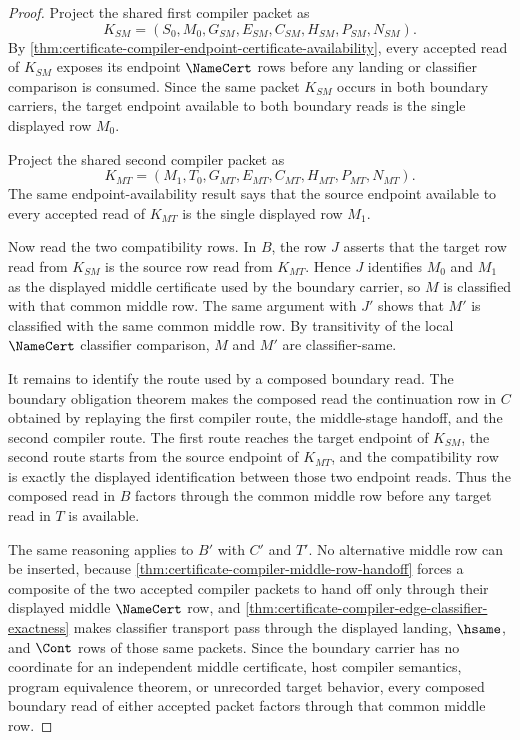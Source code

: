 \begin{proof}
Project the shared first compiler packet as
$$
K_{SM}=(S_{0},M_{0},G_{SM},E_{SM},C_{SM},H_{SM},P_{SM},N_{SM}).
$$
By \autoref{thm:certificate-compiler-endpoint-certificate-availability}, every accepted read of $K_{SM}$ exposes its endpoint $\NameCert$ rows before any landing or classifier comparison is consumed. Since the same packet $K_{SM}$ occurs in both boundary carriers, the target endpoint available to both boundary reads is the single displayed row $M_{0}$.

Project the shared second compiler packet as
$$
K_{MT}=(M_{1},T_{0},G_{MT},E_{MT},C_{MT},H_{MT},P_{MT},N_{MT}).
$$
The same endpoint-availability result says that the source endpoint available to every accepted read of $K_{MT}$ is the single displayed row $M_{1}$.

Now read the two compatibility rows. In $B$, the row $J$ asserts that the target row read from $K_{SM}$ is the source row read from $K_{MT}$. Hence $J$ identifies $M_{0}$ and $M_{1}$ as the displayed middle certificate used by the boundary carrier, so $M$ is classified with that common middle row. The same argument with $J'$ shows that $M'$ is classified with the same common middle row. By transitivity of the local $\NameCert$ classifier comparison, $M$ and $M'$ are classifier-same.

It remains to identify the route used by a composed boundary read. The boundary obligation theorem makes the composed read the continuation row in $C$ obtained by replaying the first compiler route, the middle-stage handoff, and the second compiler route. The first route reaches the target endpoint of $K_{SM}$, the second route starts from the source endpoint of $K_{MT}$, and the compatibility row is exactly the displayed identification between those two endpoint reads. Thus the composed read in $B$ factors through the common middle row before any target read in $T$ is available.

The same reasoning applies to $B'$ with $C'$ and $T'$. No alternative middle row can be inserted, because \autoref{thm:certificate-compiler-middle-row-handoff} forces a composite of the two accepted compiler packets to hand off only through their displayed middle $\NameCert$ row, and \autoref{thm:certificate-compiler-edge-classifier-exactness} makes classifier transport pass through the displayed landing, $\hsame$, and $\Cont$ rows of those same packets. Since the boundary carrier has no coordinate for an independent middle certificate, host compiler semantics, program equivalence theorem, or unrecorded target behavior, every composed boundary read of either accepted packet factors through that common middle row.
\end{proof}

